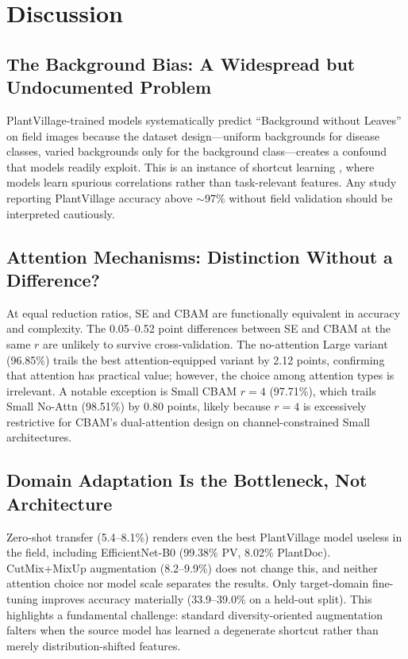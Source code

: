 \documentclass[preprint,12pt]{elsarticle}
\begin{document}
\section{Discussion}
\label{sec:discussion}

\subsection{The Background Bias: A Widespread but Undocumented Problem}

PlantVillage-trained models systematically predict ``Background without Leaves'' on field images because the dataset design—uniform backgrounds for disease classes, varied backgrounds only for the background class—creates a confound that models readily exploit. This is an instance of shortcut learning \cite{Geirhos2020}, where models learn spurious correlations rather than task-relevant features. Any study reporting PlantVillage accuracy above $\sim$97\% without field validation should be interpreted cautiously.

\subsection{Attention Mechanisms: Distinction Without a Difference?}

At equal reduction ratios, SE and CBAM are functionally equivalent in accuracy and complexity. The 0.05--0.52 point differences between SE and CBAM at the same $r$ are unlikely to survive cross-validation. The no-attention Large variant (96.85\%) trails the best attention-equipped variant by 2.12 points, confirming that attention has practical value; however, the choice among attention types is irrelevant. A notable exception is Small CBAM $r=4$ (97.71\%), which trails Small No-Attn (98.51\%) by 0.80 points, likely because $r=4$ is excessively restrictive for CBAM's dual-attention design on channel-constrained Small architectures.

\subsection{Domain Adaptation Is the Bottleneck, Not Architecture}

Zero-shot transfer (5.4--8.1\%) renders even the best PlantVillage model useless in the field, including EfficientNet-B0 (99.38\% PV, 8.02\% PlantDoc). CutMix+MixUp augmentation (8.2--9.9\%) does not change this, and neither attention choice nor model scale separates the results. Only target-domain fine-tuning improves accuracy materially (33.9--39.0\% on a held-out split). This highlights a fundamental challenge: standard diversity-oriented augmentation falters when the source model has learned a degenerate shortcut rather than merely distribution-shifted features.
\end{document}
